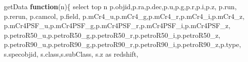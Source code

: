 \documentclass[11pt]{article}
\newenvironment{Shaded}{}{}
\newcommand{\KeywordTok}[1]{\textcolor[rgb]{0.00,0.44,0.13}{\textbf{{#1}}}}
\newcommand{\NormalTok}[1]{{#1}}
\newcommand{\VariableTok}[1]{\textcolor[rgb]{0.10,0.09,0.49}{{#1}}}
\newcommand{\OperatorTok}[1]{\textcolor[rgb]{0.40,0.40,0.40}{{#1}}}
\newcommand{\AttributeTok}[1]{\textcolor[rgb]{0.49,0.56,0.16}{{#1}}}
\begin{document}
\begin{Shaded}
\begin{Highlighting}[]
\NormalTok{getData }\KeywordTok{function}\NormalTok{(n)}\OperatorTok{\{}
\NormalTok{    select top n}
    \VariableTok{p}\NormalTok{.}\AttributeTok{objid}\OperatorTok{,}\VariableTok{p}\NormalTok{.}\AttributeTok{ra}\OperatorTok{,}\VariableTok{p}\NormalTok{.}\AttributeTok{dec}\OperatorTok{,}\VariableTok{p}\NormalTok{.}\AttributeTok{u}\OperatorTok{,}\VariableTok{p}\NormalTok{.}\AttributeTok{g}\OperatorTok{,}\VariableTok{p}\NormalTok{.}\AttributeTok{r}\OperatorTok{,}\VariableTok{p}\NormalTok{.}\AttributeTok{i}\OperatorTok{,}\VariableTok{p}\NormalTok{.}\AttributeTok{z}\OperatorTok{,}
    \VariableTok{p}\NormalTok{.}\AttributeTok{run}\OperatorTok{,} \VariableTok{p}\NormalTok{.}\AttributeTok{rerun}\OperatorTok{,} \VariableTok{p}\NormalTok{.}\AttributeTok{camcol}\OperatorTok{,} \VariableTok{p}\NormalTok{.}\AttributeTok{field}\OperatorTok{,}
     \VariableTok{p}\NormalTok{.}\AttributeTok{mCr4_u}\OperatorTok{,}\VariableTok{p}\NormalTok{.}\AttributeTok{mCr4_g}\OperatorTok{,}\VariableTok{p}\NormalTok{.}\AttributeTok{mCr4_r}\OperatorTok{,}\VariableTok{p}\NormalTok{.}\AttributeTok{mCr4_i}\OperatorTok{,}\VariableTok{p}\NormalTok{.}\AttributeTok{mCr4_z}\OperatorTok{,}
     \VariableTok{p}\NormalTok{.}\AttributeTok{mCr4PSF_u}\OperatorTok{,}\VariableTok{p}\NormalTok{.}\AttributeTok{mCr4PSF_g}\OperatorTok{,}\VariableTok{p}\NormalTok{.}\AttributeTok{mCr4PSF_r}\OperatorTok{,}\VariableTok{p}\NormalTok{.}\AttributeTok{mCr4PSF_i}\OperatorTok{,}\VariableTok{p}\NormalTok{.}\AttributeTok{mCr4PSF_z}\OperatorTok{,}
     \VariableTok{p}\NormalTok{.}\AttributeTok{petroR50_u}\OperatorTok{,}\VariableTok{p}\NormalTok{.}\AttributeTok{petroR50_g}\OperatorTok{,}\VariableTok{p}\NormalTok{.}\AttributeTok{petroR50_r}\OperatorTok{,}\VariableTok{p}\NormalTok{.}\AttributeTok{petroR50_i}\OperatorTok{,}\VariableTok{p}\NormalTok{.}\AttributeTok{petroR50_z}\OperatorTok{,}
     \VariableTok{p}\NormalTok{.}\AttributeTok{petroR90_u}\OperatorTok{,}\VariableTok{p}\NormalTok{.}\AttributeTok{petroR90_g}\OperatorTok{,}\VariableTok{p}\NormalTok{.}\AttributeTok{petroR90_r}\OperatorTok{,}\VariableTok{p}\NormalTok{.}\AttributeTok{petroR90_i}\OperatorTok{,}\VariableTok{p}\NormalTok{.}\AttributeTok{petroR90_z}\OperatorTok{,}\VariableTok{p}\NormalTok{.}\AttributeTok{type}\OperatorTok{,}
     \VariableTok{s}\NormalTok{.}\AttributeTok{specobjid}\OperatorTok{,} \VariableTok{s}\NormalTok{.}\AttributeTok{class}\OperatorTok{,}\VariableTok{s}\NormalTok{.}\AttributeTok{subClass}\OperatorTok{,} \VariableTok{s}\NormalTok{.}\AttributeTok{z} \AttributeTok{as} \AttributeTok{redshift}\OperatorTok{,}

\end{Highlighting}
\end{Shaded}
\end{document}
